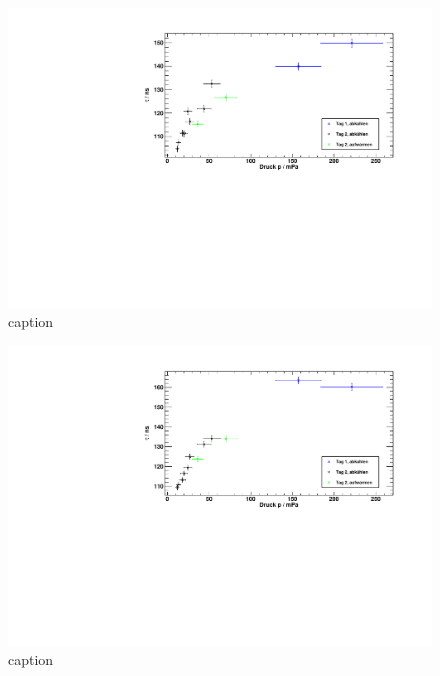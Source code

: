 \begin{figure}[H]
\begin{center}
  \includegraphics[width=\textwidth]{../img/taus_45.pdf}
  \caption{caption}
  \label{img:taus:45}
\end{center}
\end{figure}

\begin{figure}[H]
\begin{center}
  \includegraphics[width=\textwidth]{../img/taus_90.pdf}
  \caption{caption}
  \label{img:taus:90}
\end{center}
\end{figure}

